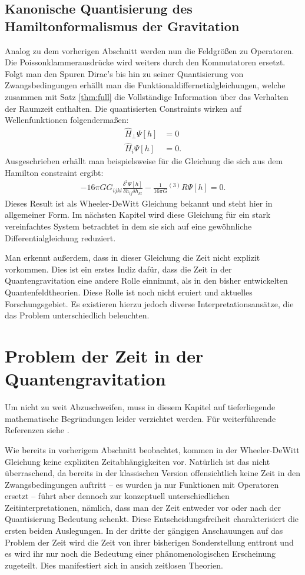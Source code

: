 \documentclass{scrartcl}
\newcommand{\inHS}{{}^{(3)}\!}
\begin{document}
	\subsection{Kanonische Quantisierung des Hamiltonformalismus der Gravitation}
		Analog zu dem vorherigen Abschnitt werden nun die Feldgrößen zu Operatoren.
		Die Poissonklammerausdrücke wird weiters durch den Kommutatoren ersetzt.
		Folgt man den Spuren Dirac's bis hin zu seiner Quantisierung von Zwangsbedingungen \cite{dirac2001lectures}
		erhällt man die Funktionaldiffernetialgleichungen, welche zusammen mit Satz \ref{thm:full} die Vollständige
		Information über das Verhalten der Raumzeit enthalten. Die quantisierten Constraints wirken auf Wellenfunktionen folgendermaßen:
		\begin{align}
			\hat{H}_\perp\Psi[h]&=0\\
			\hat{H}_i\Psi[h]&=0.
		\end{align}
		Ausgeschrieben erhällt man beispielsweise für die Gleichung die sich aus dem Hamilton constraint ergibt:
		\begin{align}
			-16\pi G G_{ijkl}\frac{\delta^2\Psi[h]}{\delta h_{ij}\delta h_{kl}}-\frac{1}{16\pi G}\inHS R\Psi[h]=0.
		\end{align}
		Dieses Result ist als Wheeler-DeWitt Gleichung bekannt und steht hier in allgemeiner Form. Im nächsten Kapitel
		wird diese Gleichung für ein stark vereinfachtes System betrachtet in dem sie sich auf eine gewöhnliche 
		Differentialgleichung reduziert.
		
		Man erkennt außerdem, dass in dieser Gleichung die Zeit nicht explizit vorkommen. Dies ist ein erstes Indiz dafür, dass
		die Zeit in der Quantengravitation eine andere Rolle einnimmt, als in den bisher entwickelten Quantenfeldtheorien.
		Diese Rolle ist noch nicht eruiert und aktuelles Forschungsgebiet. Es existieren hierzu jedoch diverse
		Interpretationsansätze, die das Problem unterschiedlich beleuchten.
	\section{Problem der Zeit in der Quantengravitation}
		Um nicht zu weit Abzuschweifen, muss in diesem Kapitel auf tieferliegende
		mathematische Begründungen leider verzichtet werden. Für weiterführende Referenzen
		siehe \cite{qg06,gr-qc/9210011}.
		
		Wie bereits in vorherigem Abschnitt beobachtet, kommen in der Wheeler-DeWitt Gleichung keine
		expliziten Zeitabhängigkeiten vor. Natürlich ist das nicht überraschend, da bereits in der klassischen Version
		offensichtlich keine Zeit in den Zwangsbedingungen auftritt -- es wurden ja nur Funktionen
		mit Operatoren ersetzt -- führt aber dennoch zur konzeptuell unterschiedlichen Zeitinterpretationen, nämlich,
		dass man der Zeit entweder vor oder nach der Quantisierung Bedeutung schenkt. Diese Entscheidungsfreiheit charakterisiert
		die ersten beiden Auslegungen. In der dritte der gängigen Anschauungen auf das Problem der Zeit 
		wird die Zeit von ihrer bisherigen Sonderstellung enttront und es wird ihr nur noch die Bedeutung
		einer phänomenologischen Erscheinung zugeteilt. Dies manifestiert sich in ansich zeitlosen Theorien.
		
\end{document}
